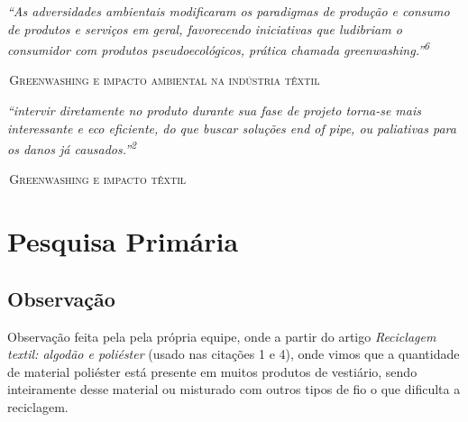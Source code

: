 \documentclass[12pt, a4paper]{article}
\newcommand{\novaSecao}[1]{\clearpage\vspace*{2.2cm}\section{#1}}
\newenvironment{citacaoBox}{%
  \par\vspace{6pt}%
  \def\FrameCommand{{\color{oliveSoft}\vrule width 2pt}\hspace{12pt}}%
  \MakeFramed{\advance\hsize-\width\FrameRestore}%
  \small\itshape\color{ink}%
}{%
  \par\endMakeFramed\vspace{6pt}%
}
\newcommand{\citacaoDestaque}[2]{%
  \begin{citacaoBox}#1\par\vspace{4pt}%
    {\normalfont\footnotesize\color{slate}\hfill\textsc{\textemdash{}\,#2}}%
  \end{citacaoBox}%
}
\newif\ifmostrarcorrecoes
\newcommand{\correcao}[1]{%
  \ifmostrarcorrecoes
    \par\vspace{6pt}\noindent
    \setlength{\fboxsep}{9pt}%
    \fcolorbox{corCorrecao}{corCorrecaoBg}{%
      \begin{minipage}{\dimexpr\linewidth-2\fboxsep-2\fboxrule\relax}
        {\sffamily\bfseries\footnotesize\color{corCorrecao}\textsf{CORREÇÃO \textemdash{} PROFA. SAMARA}}\par\vspace{3pt}
        {\normalfont\small\color{corCorrecao} #1}
      \end{minipage}}%
    \par\vspace{6pt}
  \fi
}
\begin{document}
\citacaoDestaque{``As adversidades ambientais modificaram os paradigmas de produção e consumo de produtos e serviços em geral, favorecendo iniciativas que ludibriam o consumidor com produtos pseudoecológicos, prática chamada greenwashing.''\textsuperscript{6}}{Greenwashing e impacto ambiental na indústria têxtil}

\citacaoDestaque{``intervir diretamente no produto durante sua fase de projeto torna-se mais interessante e eco eficiente, do que buscar soluções end of pipe, ou paliativas para os danos já causados.''\textsuperscript{2}}{Greenwashing e impacto têxtil}

\novaSecao{Pesquisa Primária}

\subsection{Observação}
\correcao{A observação direta de marcas foi realizada, mas não está registrada na documentação. Além disso, a ordem e a estrutura desta seção estão incorretas: descrever o procedimento da observação (o que foi observado, onde e como) e reposicioná-la na sequência correta da Imersão.}
Observação feita pela pela própria equipe, onde a partir do artigo \textit{Reciclagem textil: algodão e poliéster} (usado nas citações 1 e 4), onde vimos que a quantidade de material poliéster está presente em muitos produtos de vestiário, sendo inteiramente desse material ou misturado com outros tipos de fio o que dificulta a reciclagem.
\end{document}
